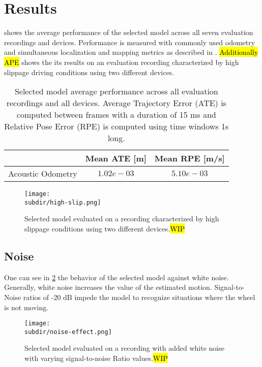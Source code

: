 \section{Results} \label{sec:results}

 shows the average performance of the
selected model across all seven evaluation recordings and devices. Performance
is measured with commonly used odometry and simultaneous localization and
mapping metrics as described in \cite{Measuring2019}. \hl{Additionally APE}
 shows the its results on an evaluation recording
characterized by high slippage driving conditions using two different devices.

\begin{table}
    \centering
    \begin{tabular}{|c|c|c|}
        \hline
                          & Mean ATE [m] & Mean RPE [m/s] \\ \hline
        Acoustic Odometry & $1.02e-03$   & $5.10e-03$     \\
        \hline
    \end{tabular}
    \caption[Selected model average performance across evaluation recordings
        and devices]{Selected model average performance across all evaluation
        recordings and all devices. Average Trajectory Error (ATE) is computed
        between frames with a duration of 15 ms and Relative Pose Error (RPE)
        is computed using time windows 1s long.}
    \label{table:results-selected-model}
\end{table}


\begin{figure}
    \centering
    \texttt{[image: \\subdir/high-slip.png]}
    \caption[Selected model on high slippage conditions]{Selected model
        evaluated on a recording characterized by high slippage conditions
        using two different devices.\hl{WIP}}
    \label{fig:high-slip}
\end{figure}

\subsection{Noise} One can see in \cref{fig:noise-effect} the behavior of the
selected model against white noise. Generally, white noise increases the value
of the estimated motion. Signal-to-Noise ratios of -20 dB impede the model to
recognize situations where the wheel is not moving.

\begin{figure}
    \centering
    \texttt{[image: \\subdir/noise-effect.png]}
    \caption[Selected model with white noise]{Selected model evaluated on a
        recording with added white noise with varying signal-to-noise Ratio
        values.\hl{WIP}}
    \label{fig:noise-effect}
\end{figure}

